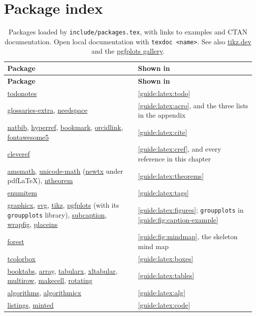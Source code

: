 \section{Package index}\label{guide:latex:index}
\newcommand{\ctan}[1]{\href{https://ctan.org/pkg/#1}{#1}}
\begin{xltabular}{\linewidth}{>{\ttfamily\raggedright\arraybackslash{}\hsize}X >{\raggedright\arraybackslash{}\hsize}X}
  \caption{Packages loaded by \texttt{include/packages.tex}, with links to examples and CTAN documentation. Open local documentation with \texttt{texdoc <name>}. See also \href{https://tikz.dev/}{tikz.dev} and the \href{https://pgfplots.sourceforge.net/}{pgfplots gallery}.}\label{guide:tab:package-index}\\
  \toprule
  \normalfont\textbf{Package} & \textbf{Shown in} \\
  \midrule
  \endfirsthead
  \toprule
  \normalfont\textbf{Package} & \textbf{Shown in} \\
  \midrule
  \endhead
  \ctan{todonotes} & \cref{guide:latex:todo} \\
  \ctan{glossaries-extra}, \ctan{needspace} & \cref{guide:latex:acro}, and the three lists in the appendix \\
  \ctan{natbib}, \ctan{hyperref}, \ctan{bookmark}, \ctan{orcidlink}, \ctan{fontawesome5} & \cref{guide:latex:cite} \\
  \ctan{cleveref} & \cref{guide:latex:cref}, and every reference in this chapter \\
  \ctan{amsmath}, \ctan{unicode-math} (\ctan{newtx} under pdfLaTeX), \ctan{ntheorem} & \cref{guide:latex:theorems} \\
  \ctan{enumitem} & \cref{guide:latex:tags} \\
  \ctan{graphicx}, \ctan{svg}, \ctan{tikz}, \ctan{pgfplots} (with its \texttt{groupplots} library), \ctan{subcaption}, \ctan{wrapfig}, \ctan{placeins} & \cref{guide:latex:figures}; \texttt{groupplots} in \cref{guide:fig:caption-example} \\
  \ctan{forest} & \cref{guide:fig:mindmap}, the skeleton mind map \\
  \ctan{tcolorbox} & \cref{guide:latex:boxes} \\
  \ctan{booktabs}, \ctan{array}, \ctan{tabularx}, \ctan{xltabular}, \ctan{multirow}, \ctan{makecell}, \ctan{rotating} & \cref{guide:latex:tables} \\
  \ctan{algorithms}, \ctan{algorithmicx} & \cref{guide:latex:alg} \\
  \ctan{listings}, \ctan{minted} & \cref{guide:latex:code} \\

\end{xltabular}
